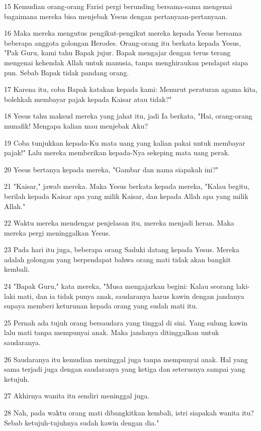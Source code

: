 \par 15 Kemudian orang-orang Farisi pergi berunding bersama-sama mengenai bagaimana mereka bisa menjebak Yesus dengan pertanyaan-pertanyaan.
\par 16 Maka mereka mengutus pengikut-pengikut mereka kepada Yesus bersama beberapa anggota golongan Herodes. Orang-orang itu berkata kepada Yesus, "Pak Guru, kami tahu Bapak jujur. Bapak mengajar dengan terus terang mengenai kehendak Allah untuk manusia, tanpa menghiraukan pendapat siapa pun. Sebab Bapak tidak pandang orang.
\par 17 Karena itu, coba Bapak katakan kepada kami: Menurut peraturan agama kita, bolehkah membayar pajak kepada Kaisar atau tidak?"
\par 18 Yesus tahu maksud mereka yang jahat itu, jadi Ia berkata, "Hai, orang-orang munafik! Mengapa kalian mau menjebak Aku?
\par 19 Coba tunjukkan kepada-Ku mata uang yang kalian pakai untuk membayar pajak!" Lalu mereka memberikan kepada-Nya sekeping mata uang perak.
\par 20 Yesus bertanya kepada mereka, "Gambar dan nama siapakah ini?"
\par 21 "Kaisar," jawab mereka. Maka Yesus berkata kepada mereka, "Kalau begitu, berilah kepada Kaisar apa yang milik Kaisar, dan kepada Allah apa yang milik Allah."
\par 22 Waktu mereka mendengar penjelasan itu, mereka menjadi heran. Maka mereka pergi meninggalkan Yesus.
\par 23 Pada hari itu juga, beberapa orang Saduki datang kepada Yesus. Mereka adalah golongan yang berpendapat bahwa orang mati tidak akan bangkit kembali.
\par 24 "Bapak Guru," kata mereka, "Musa mengajarkan begini: Kalau seorang laki-laki mati, dan ia tidak punya anak, saudaranya harus kawin dengan jandanya supaya memberi keturunan kepada orang yang sudah mati itu.
\par 25 Pernah ada tujuh orang bersaudara yang tinggal di sini. Yang sulung kawin lalu mati tanpa mempunyai anak. Maka jandanya ditinggalkan untuk saudaranya.
\par 26 Saudaranya itu kemudian meninggal juga tanpa mempunyai anak. Hal yang sama terjadi juga dengan saudaranya yang ketiga dan seterusnya sampai yang ketujuh.
\par 27 Akhirnya wanita itu sendiri meninggal juga.
\par 28 Nah, pada waktu orang mati dibangkitkan kembali, istri siapakah wanita itu? Sebab ketujuh-tujuhnya sudah kawin dengan dia."
